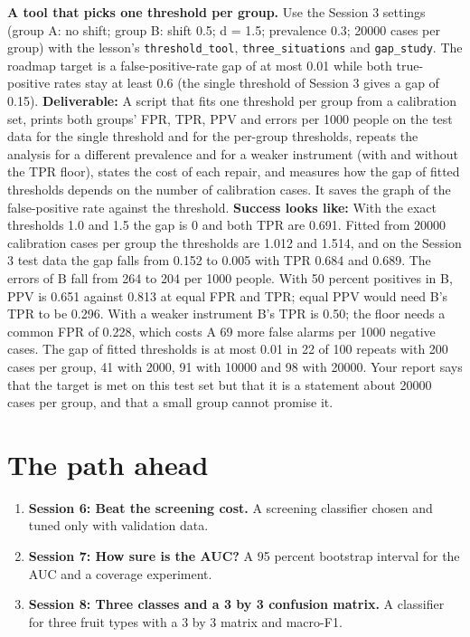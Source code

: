\documentclass[11pt,a4paper]{article}
\begin{document}
\textbf{A tool that picks one threshold per group.} Use the Session 3 settings (group A: no shift; group B: shift 0.5; d = 1.5; prevalence 0.3; 20000 cases per group) with the lesson's \texttt{threshold\_tool}, \texttt{three\_situations} and \texttt{gap\_study}. The roadmap target is a false-positive-rate gap of at most 0.01 while both true-positive rates stay at least 0.6 (the single threshold of Session 3 gives a gap of 0.15). \textbf{Deliverable:} A script that fits one threshold per group from a calibration set, prints both groups' FPR, TPR, PPV and errors per 1000 people on the test data for the single threshold and for the per-group thresholds, repeats the analysis for a different prevalence and for a weaker instrument (with and without the TPR floor), states the cost of each repair, and measures how the gap of fitted thresholds depends on the number of calibration cases. It saves the graph of the false-positive rate against the threshold. \textbf{Success looks like:} With the exact thresholds 1.0 and 1.5 the gap is 0 and both TPR are 0.691. Fitted from 20000 calibration cases per group the thresholds are 1.012 and 1.514, and on the Session 3 test data the gap falls from 0.152 to 0.005 with TPR 0.684 and 0.689. The errors of B fall from 264 to 204 per 1000 people. With 50 percent positives in B, PPV is 0.651 against 0.813 at equal FPR and TPR; equal PPV would need B's TPR to be 0.296. With a weaker instrument B's TPR is 0.50; the floor needs a common FPR of 0.228, which costs A 69 more false alarms per 1000 negative cases. The gap of fitted thresholds is at most 0.01 in 22 of 100 repeats with 200 cases per group, 41 with 2000, 91 with 10000 and 98 with 20000. Your report says that the target is met on this test set but that it is a statement about 20000 cases per group, and that a small group cannot promise it.

\section{The path ahead}
\begin{enumerate}[nosep]
\item \textbf{Session 6: Beat the screening cost.} A screening classifier chosen and tuned only with validation data.
\item \textbf{Session 7: How sure is the AUC?} A 95 percent bootstrap interval for the AUC and a coverage experiment.
\item \textbf{Session 8: Three classes and a 3 by 3 confusion matrix.} A classifier for three fruit types with a 3 by 3 matrix and macro-F1.
\end{enumerate}
\end{document}
